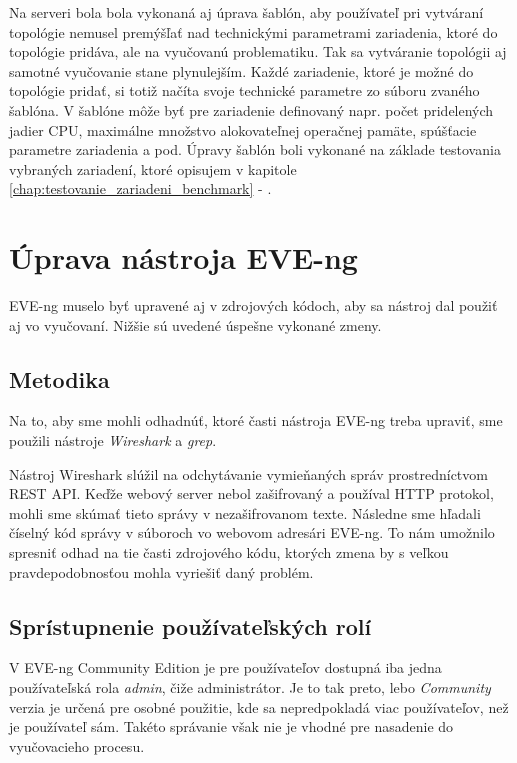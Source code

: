 Na serveri bola bola vykonaná aj úprava šablón, aby používateľ pri vytváraní topológie nemusel premýšľať nad technickými parametrami zariadenia, ktoré do topológie pridáva, ale na vyučovanú problematiku. Tak sa vytváranie topológii aj samotné vyučovanie stane plynulejším. Každé zariadenie, ktoré je možné do topológie pridať, si totiž načíta svoje technické parametre zo súboru zvaného šablóna. V šablóne môže byť pre zariadenie definovaný napr. počet pridelených jadier CPU, maximálne množstvo alokovateľnej operačnej pamäte, spúšťacie parametre zariadenia a pod. Úpravy šablón boli vykonané na základe testovania vybraných zariadení, ktoré opisujem v kapitole \ref{chap:testovanie_zariadeni_benchmark} - .




\section{Úprava nástroja EVE-ng}
\label{chap:eve_ng_uprava_zdroj_kodov}

EVE-ng muselo byť upravené aj v zdrojových kódoch, aby sa nástroj dal použiť aj vo vyučovaní. Nižšie sú uvedené úspešne vykonané zmeny.




\subsection{Metodika}

Na to, aby sme mohli odhadnúť, ktoré časti nástroja EVE-ng treba upraviť, sme použili nástroje \emph{Wireshark} a \emph{grep}.

Nástroj Wireshark slúžil na odchytávanie vymieňaných správ prostredníctvom REST API. Keďže webový server nebol zašifrovaný a používal HTTP protokol, mohli sme skúmať tieto správy v nezašifrovanom texte. Následne sme hľadali číselný kód správy v súboroch vo webovom adresári EVE-ng. To nám umožnilo spresniť odhad na tie časti zdrojového kódu, ktorých zmena by s veľkou pravdepodobnosťou mohla vyriešiť daný problém.




\subsection{Sprístupnenie používateľských rolí}
\label{chap:eve_ng_pouzivatelske_role}

V EVE-ng Community Edition je pre používateľov dostupná iba jedna používateľská rola \mbox{\emph{admin}}, čiže administrátor. Je to tak preto, lebo \emph{Community} verzia je určená pre osobné použitie, kde sa nepredpokladá viac používateľov, než je používateľ sám. Takéto správanie však nie je vhodné pre nasadenie do vyučovacieho procesu.

